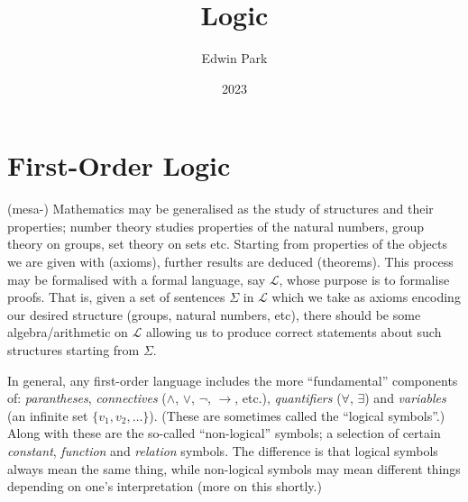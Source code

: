 \documentclass{article}
\title{Logic}
\author{Edwin Park}
\date{2023}
\theoremstyle{definition}
\begin{document}
\clearpage\maketitle\thispagestyle{empty}
\newpage
\tableofcontents
\newpage\setcounter{page}{1}
\section{First-Order Logic}
(mesa-) Mathematics may be generalised as the study of structures and their properties; number theory studies properties of the natural numbers, group theory on groups, set theory on sets etc. Starting from properties of the objects we are given with (axioms), further results are deduced (theorems). This process may be formalised with a formal language, say $\mathcal{L}$, whose purpose is to formalise proofs. That is, given a set of sentences $\Sigma$ in $\mathcal{L}$ which we take as axioms encoding our desired structure (groups, natural numbers, etc), there should be some algebra/arithmetic on $\mathcal{L}$ allowing us to produce correct statements about such structures starting from $\Sigma$.\par

In general, any first-order language includes the more ``fundamental'' components of: \emph{parantheses}, \emph{connectives} ($\land$, $\lor$, $\neg$, $\rightarrow$, etc.), \emph{quantifiers} ($\forall$, $\exists$) and \emph{variables} (an infinite set $\{v_1,v_2,\dots\}$). (These are sometimes called the ``logical symbols''.) Along with these are the so-called ``non-logical'' symbols; a selection of certain \emph{constant}, \emph{function} and \emph{relation} symbols. The difference is that logical symbols always mean the same thing, while non-logical symbols may mean different things depending on one's interpretation (more on this shortly.)\par
\end{document}
